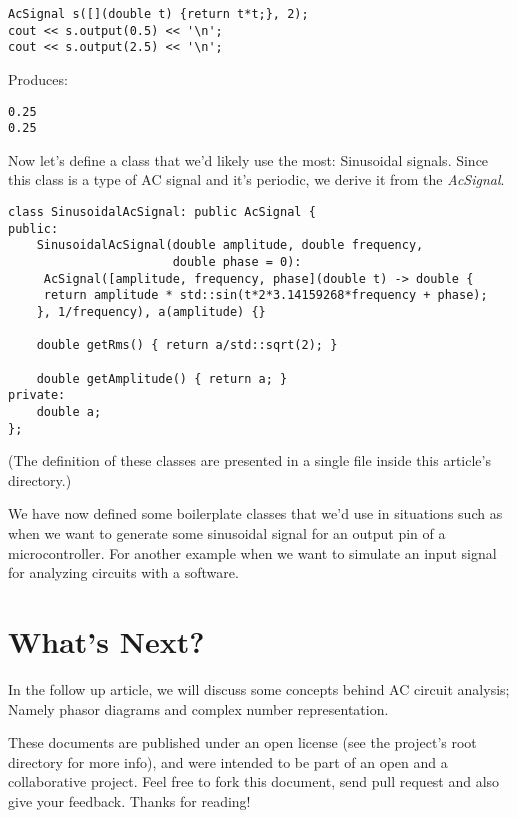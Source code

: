 \documentclass{article}
\begin{document}
	\begin{verbatim}
AcSignal s([](double t) {return t*t;}, 2);
cout << s.output(0.5) << '\n';
cout << s.output(2.5) << '\n';
	\end{verbatim}
	
	Produces:
	
	\begin{verbatim}
0.25
0.25
	\end{verbatim}

	Now let's define a class that we'd likely use the most: Sinusoidal signals. 
	Since this class is a type of AC signal and it's periodic, we derive it from the \textit{AcSignal}.
	
	\begin{verbatim}
class SinusoidalAcSignal: public AcSignal {
public:
    SinusoidalAcSignal(double amplitude, double frequency,
                       double phase = 0):
     AcSignal([amplitude, frequency, phase](double t) -> double {
     return amplitude * std::sin(t*2*3.14159268*frequency + phase);
    }, 1/frequency), a(amplitude) {}

    double getRms() { return a/std::sqrt(2); }

    double getAmplitude() { return a; }
private:
    double a;
};
	\end{verbatim}

	(The definition of these classes are presented in a single file inside this article's directory.)
	
	We have now defined some boilerplate classes that we'd use in situations such as when we want to generate some sinusoidal signal for an output pin of a microcontroller.
	For another example when we want to simulate an input signal for analyzing circuits with a software.
		
	\section{What's Next?}
	In the follow up article, we will discuss some concepts behind AC circuit analysis; Namely phasor diagrams and complex number representation.
	
	These documents are published under an open license (see the project's root directory for more info), and were intended to be part of an open and a collaborative project.
	Feel free to fork this document, send pull request and also give your feedback. 
	Thanks for reading!
\end{document}
